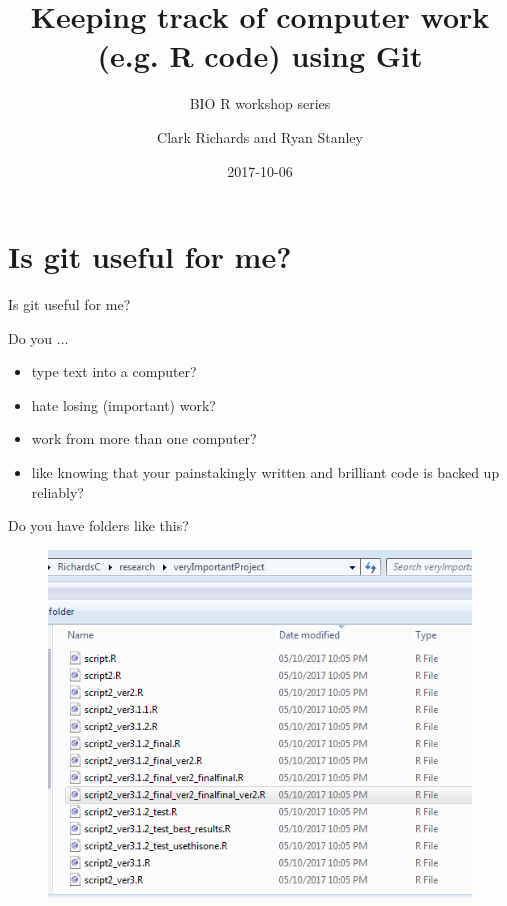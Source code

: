 \documentclass{beamer}
\title[Git MTM] %
{Keeping track of computer work (e.g. R code) using Git}
\subtitle
{BIO R workshop series}
\author
{Clark Richards and Ryan Stanley}
\date%
{2017-10-06}
\begin{document}
\begin{frame}
  \titlepage
\end{frame}



\section{Is git useful for me?}

\begin{frame}{Is git useful for me?}

Do you ...
\begin{itemize}
\item<1-4> type text into a computer?
\item<2-4> hate losing (important) work?
\item<3-4> work from more than one computer?
\item<4> like knowing that your painstakingly written and brilliant
  code is backed up reliably?
\end{itemize}

\end{frame}

\begin{frame}

  Do you have folders like this?
  \begin{figure}
    \centering
    \includegraphics[height=0.9\textheight]{versioncontrol}
  \end{figure}

\end{frame}
\end{document}
